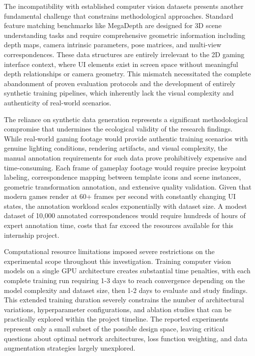 The incompatibility with established computer vision datasets presents another
fundamental challenge that constrains methodological approaches. Standard
feature matching benchmarks like MegaDepth are designed for 3D scene
understanding tasks and require comprehensive geometric information including
depth maps, camera intrinsic parameters, pose matrices, and multi-view
correspondences. These data structures are entirely irrelevant to the 2D gaming
interface context, where UI elements exist in screen space without meaningful
depth relationships or camera geometry. This mismatch necessitated the complete
abandonment of proven evaluation protocols and the development of entirely
synthetic training pipelines, which inherently lack the visual complexity and
authenticity of real-world scenarios.

The reliance on synthetic data generation represents a significant
methodological compromise that undermines the ecological validity of the
research findings. While real-world gaming footage would provide authentic
training scenarios with genuine lighting conditions, rendering artifacts, and
visual complexity, the manual annotation requirements for such data prove
prohibitively expensive and time-consuming. Each frame of gameplay footage
would require precise keypoint labeling, correspondence mapping between
template icons and scene instances, geometric transformation annotation, and
extensive quality validation. Given that modern games render at 60+ frames per
second with constantly changing UI states, the annotation workload scales
exponentially with dataset size. A modest dataset of 10,000 annotated
correspondences would require hundreds of hours of expert annotation time,
costs that far exceed the resources available for this internship project.

Computational resource limitations imposed severe restrictions on the
experimental scope throughout this investigation. Training computer vision
models on a single GPU architecture creates substantial time penalties, with
each complete training run requiring 1-3 days to reach convergence depending on
the model complexity and dataset size, then 1-2 days to evaluate and study
findings. This extended training duration severely constrains the number of
architectural variations, hyperparameter configurations, and ablation studies
that can be practically explored within the project timeline. The reported
experiments represent only a small subset of the possible design space, leaving
critical questions about optimal network architectures, loss function
weighting, and data augmentation strategies largely unexplored.

